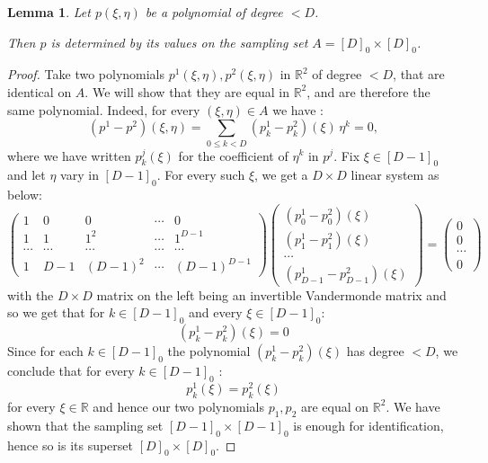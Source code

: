 \documentclass[12pt,a4paper,oneside]{amsart}
\newtheorem{lemma}{Lemma}[section]
\theoremstyle{definition}
\newcommand{\RR}{{\mathbb R}}
\newcounter{rem}
\begin{document}
\begin{lemma}\label{bipoly}
Let $p(\xi, \eta)$ be a polynomial of degree $< D$.

Then $p$ is determined by its values on the sampling set $A = [D]_0\times[D]_0$.
\end{lemma}
\begin{proof}
Take two polynomials $p^1(\xi,\eta), p^2 (\xi,\eta)$ in $\RR^2$ of degree $< D$, that are identical on $A$. We will show that they are equal in $\RR^2$, and are therefore the same polynomial. Indeed, for every $(\xi,\eta) \in A$ we have :
\begin{equation*}
(p^1-p^2)(\xi,\eta) = \sum_{0\le k < D}( p_k^1 -p_k^2)( \xi ) \, \eta^k=0,
\end{equation*}
where we have written $p^j_k(\xi)$ for the coefficient of $\eta^k$ in $p^j$.
Fix $\xi \in [D-1]_0$ and let $\eta$ vary in $[D-1]_0$. For every such $\xi$, we get a $D\times D$ linear system as below:
\begin{equation*}
\begin{pmatrix}
1 & 0 & 0 & \cdots & 0 \\
1 & 1 & 1^2 & \cdots & 1^{D-1}\\
\cdots  & \cdots  & \cdots  & \cdots & \cdots  \\
1 & D-1 & (D-1)^2 & \cdots & (D-1)^{D-1} 
\end{pmatrix}
\begin{pmatrix}
(p_0  ^1 -p_0^2) (\xi) \\
(p_1  ^1 -p_1^2) (\xi) \\
\cdots \\
(p_{D-1}  ^1 -p_{D-1}^2) (\xi)
\end{pmatrix}
=
\begin{pmatrix}
0 \\ 0 \\ \cdots \\ 0
\end{pmatrix}
\end{equation*}
with the $D \times D$ matrix on the left being an invertible Vandermonde matrix and so we get that for $k\in [D-1]_0 $ and every $\xi\in [ D-1 ]_0$:
\begin{equation*}
(p_k ^1 -p_k ^2) (\xi) =0
\end{equation*}
 Since for each $k\in [D-1]_0 $ the polynomial $(p_k ^1 -p_k ^2) (\xi)$  has degree $< D$, we conclude that for every $k \in [D-1]_0$ :
\begin{equation*}
p_k^1 (\xi) = p_k ^2 (\xi )
\end{equation*}
for every $\xi \in \RR$ and hence our two polynomials $p_1 , p_2$ are equal on $\RR ^2$.
We have shown that the sampling set $[D-1]_0 \times [D-1]_0$ is enough for identification, hence so is its superset $[D]_0 \times [D]_0$.

\end{proof}
\end{document}
